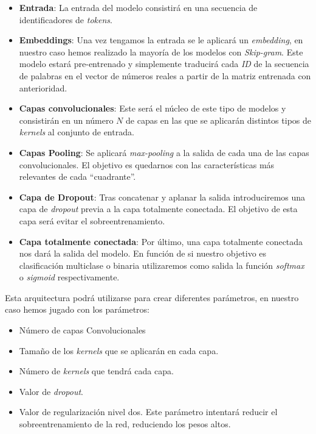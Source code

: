 \begin{itemize}
\item \textbf{Entrada}: La entrada del modelo consistirá en una secuencia de identificadores de \textit{tokens}.

 \item \textbf{Embeddings}: Una vez tengamos la entrada se le aplicará un \textit{embedding}, en nuestro caso hemos realizado la mayoría de los modelos con \textit{Skip-gram}. Este modelo estará pre-entrenado y simplemente traducirá cada \textit{ID} de la secuencia de palabras en el vector de números reales a partir de la matriz entrenada con anterioridad. 
 
 \item \textbf{Capas convolucionales}: Este será el núcleo de este tipo de modelos y consistirán en un número $N$ de capas en las que se aplicarán distintos tipos de \textit{kernels} al conjunto de entrada.
 
 
 \item \textbf{Capas Pooling}: Se aplicará \textit{max-pooling} a la salida de cada una de las capas convolucionales. El objetivo es quedarnos con las características más relevantes de cada ``cuadrante''.
 
 
 \item \textbf{Capa de Dropout}: Tras concatenar y aplanar la salida introduciremos una capa de \textit{dropout} previa a la capa totalmente conectada. El objetivo de esta capa será evitar el sobreentrenamiento. 
 
   \item \textbf{Capa totalmente conectada}: Por último, una capa totalmente conectada nos dará la salida del modelo. En función de si nuestro objetivo es clasificación multiclase o binaria utilizaremos como salida la función \textit{softmax} o \textit{sigmoid} respectivamente.
 
 
 
\end{itemize}

Esta arquitectura podrá utilizarse para crear diferentes parámetros, en nuestro caso hemos jugado con los parámetros: 

\begin{itemize}
\item Número de capas Convolucionales 
\item Tamaño de los \textit{kernels} que se aplicarán en cada capa.
\item Número de \textit{kernels} que tendrá cada capa. 
\item Valor de \textit{dropout}.
\item Valor de regularización nivel dos. Este parámetro intentará reducir el sobreentrenamiento de la red, reduciendo los pesos altos. 
\end{itemize}



